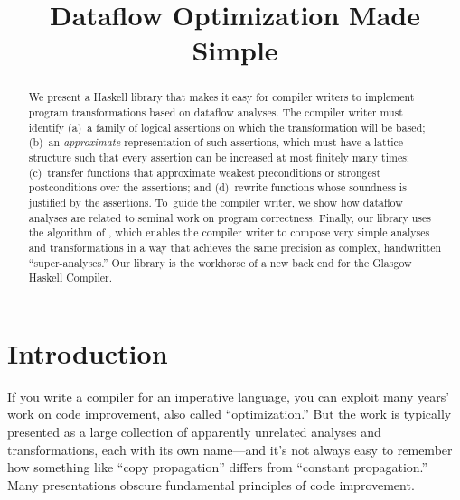 \documentclass[blockstyle,preprint,natbib,nocopyrightspace]{sigplanconf}
\begin{document}
\title{Dataflow Optimization Made Simple}



\maketitle
 
\begin{abstract}
We present a Haskell library that makes it easy for compiler writers
to implement program transformations based on dataflow analyses.
The compiler writer must identify (a)~a family of logical assertions
on which the transformation will be based;
(b)~an \emph{approximate} representation of such assertions, which
must have a lattice structure such that every assertion can be increased at
most finitely many times;
(c)~transfer functions that approximate weakest preconditions or
strongest postconditions over the assertions; and
(d)~rewrite functions whose soundness is justified by the assertions.
To~guide the compiler writer,
we show how dataflow analyses are related to
seminal work on program 
correctness. 
Finally, our library uses the algorithm of 
\citet{lerner-grove-chambers:2002}, which enables the compiler writer to
compose very simple analyses and transformations in a way that achieves
the same precision as complex, handwritten
``super-analyses.''
Our library is the workhorse of a new
back end for the Glasgow Haskell Compiler.
\end{abstract}

\makeatactive   %

\section{Introduction}

\ifpagetuning\enlargethispage{\baselineskip}\fi

If you write a compiler for an imperative language, you can exploit
many years' work on code improvement, also called
``optimization.''
But the work is typically presented
as a large collection of apparently unrelated analyses and
transformations, each with its own name---and 
it's not always easy to %
remember how something like
``copy propagation'' differs from ``constant propagation.''
Many presentations obscure fundamental principles of
code improvement.
\end{document}

